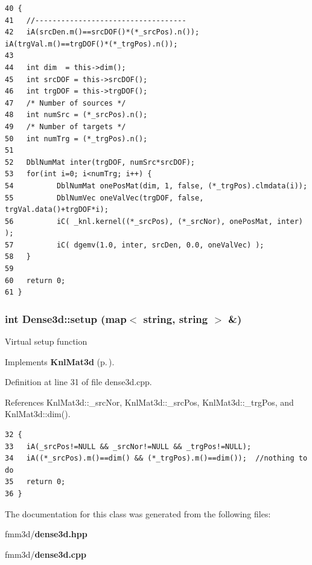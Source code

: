 \footnotesize\begin{verbatim}40 {
41   //-----------------------------------
42   iA(srcDen.m()==srcDOF()*(*_srcPos).n());  iA(trgVal.m()==trgDOF()*(*_trgPos).n());
43   
44   int dim  = this->dim();
45   int srcDOF = this->srcDOF();
46   int trgDOF = this->trgDOF();
47   /* Number of sources */
48   int numSrc = (*_srcPos).n();
49   /* Number of targets */
50   int numTrg = (*_trgPos).n();
51   
52   DblNumMat inter(trgDOF, numSrc*srcDOF);
53   for(int i=0; i<numTrg; i++) {
54          DblNumMat onePosMat(dim, 1, false, (*_trgPos).clmdata(i));
55          DblNumVec oneValVec(trgDOF, false, trgVal.data()+trgDOF*i);
56          iC( _knl.kernel((*_srcPos), (*_srcNor), onePosMat, inter) );
57          iC( dgemv(1.0, inter, srcDen, 0.0, oneValVec) );
58   }
59   
60   return 0;
61 }
\end{verbatim}\normalsize 


\subsubsection{\setlength{\rightskip}{0pt plus 5cm}int Dense3d::setup (map$<$ string, string $>$ \&)\hspace{0.3cm}{\tt  [virtual]}}\label{classDense3d_6c9d66eef2ad01ccfea65cb116bf5726_6c9d66eef2ad01ccfea65cb116bf5726}


Virtual setup function 

Implements {\bf Knl\-Mat3d} {\rm (p.\,\pageref{classKnlMat3d_24cbbecf677cd909a522d252feebf2c6_24cbbecf677cd909a522d252feebf2c6})}.

Definition at line 31 of file dense3d.cpp.

References Knl\-Mat3d::\_\-src\-Nor, Knl\-Mat3d::\_\-src\-Pos, Knl\-Mat3d::\_\-trg\-Pos, and Knl\-Mat3d::dim().

\footnotesize\begin{verbatim}32 {
33   iA(_srcPos!=NULL && _srcNor!=NULL && _trgPos!=NULL);
34   iA((*_srcPos).m()==dim() && (*_trgPos).m()==dim());  //nothing to do
35   return 0;
36 }
\end{verbatim}\normalsize 




The documentation for this class was generated from the following files:\begin{CompactItemize}
\item 
fmm3d/{\bf dense3d.hpp}\item 
fmm3d/{\bf dense3d.cpp}\end{CompactItemize}
